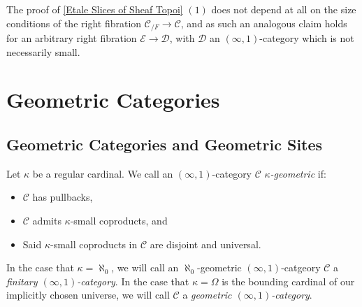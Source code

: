 \documentclass[10pt]{article}
\newcommand{\C}{\mathcal C}
\newcommand{\cD}{\mathcal{D}}
\newcommand{\cE}{\mathcal{E}}
\theoremstyle{witharg}
\theoremstyle{witharg}
\theoremstyle{witharg2}
\begin{document}
\begin{remark}{}

    The proof of \ref{Etale Slices of Sheaf Topoi} $(1)$ does not depend at all on the size conditions of the right fibration $\C_{/F}\rightarrow \C$, and as such an analogous claim holds for an arbitrary right fibration $\cE\rightarrow \cD$, with $\cD$ an $(\infty,1)$-category which is not necessarily small. 
    
\end{remark}







\section{Geometric Categories}\label{Geometric Sites}


\subsection{Geometric Categories and Geometric Sites}\label{Geometric Categories and Geometric Sites}








\begin{definition}{}\label{Geom Cat Definition}

    Let $\kappa$ be a regular cardinal. We call an $(\infty,1)$-category $\C$ \emph{$\kappa$-geometric} if:

    \begin{itemize}

        \item [$(1)$] $\C$ has pullbacks,

        \item [$(2)$] $\C$ admits $\kappa$-small coproducts, and

        \item [$(3)$] Said $\kappa$-small coproducts in $\C$ are disjoint and universal. 

    \end{itemize}

    \noindent In the case that $\kappa=\aleph_0$, we will call an $\aleph_0$-geometric $(\infty,1)$-catgeory $\C$ a \emph{finitary $(\infty,1)$-category}. In the case that $\kappa=\Omega$ is the bounding cardinal of our implicitly chosen universe, we will call $\C$ a \emph{geometric $(\infty,1)$-category}.

\end{definition}
\end{document}
